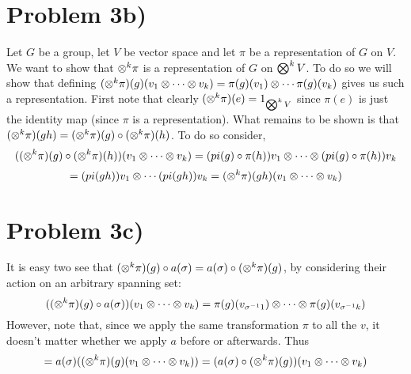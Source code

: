 \section*{Problem 3b)}
Let $G$ be a group, let $V$ be vector space and let $\pi$ be a representation of $G$ on $V$. We want to show that $\otimes^k \pi$ is a representation of $G$ on $\bigotimes^k V$. To do so we will show that defining $(\otimes^k \pi)(g)(v_1\otimes\cdots\otimes v_k)=\pi(g)(v_1)\otimes\cdots\pi(g)(v_k)$ gives us such a representation. First note that clearly $(\otimes^k \pi)(e) = 1_{\bigotimes^k V}$ since $\pi(e)$ is just the identity map (since $\pi$ is a representation). What remains to be shown is that $(\otimes^k \pi)(gh)=(\otimes^k \pi)(g)\circ (\otimes^k \pi)(h)$. To do so consider, 
\[ ((\otimes^k \pi)(g)\circ (\otimes^k \pi)(h))(v_1\otimes\cdots\otimes v_k) = (pi(g)\circ\pi(h))v_1\otimes\cdots\otimes (pi(g)\circ\pi(h))v_k \]\[= (pi(gh))v_1\otimes\cdots (pi(gh))v_k = (\otimes^k \pi)(gh)(v_1\otimes\cdots\otimes v_k)  \]
\section*{Problem 3c)}
It is easy two see that $(\otimes^k \pi)(g)\circ a(\sigma) = a(\sigma)\circ (\otimes^k \pi)(g)$, by considering their action on an arbitrary spanning set:
\[ ((\otimes^k \pi)(g)\circ a(\sigma))(v_1\otimes \cdots \otimes v_k) = \pi(g)(v_{\sigma^{-1} 1}) \otimes \cdots \otimes \pi(g)(v_{\sigma^{-1} k}) \] However, note that, since we apply the same transformation $\pi$ to all the $v$, it doesn't matter whether we apply $a$ before or afterwards. Thus
\[ = a(\sigma)((\otimes^k \pi)(g)(v_1\otimes \cdots \otimes v_k)) = (a(\sigma)\circ (\otimes^k \pi)(g))(v_1\otimes \cdots \otimes v_k) \]
